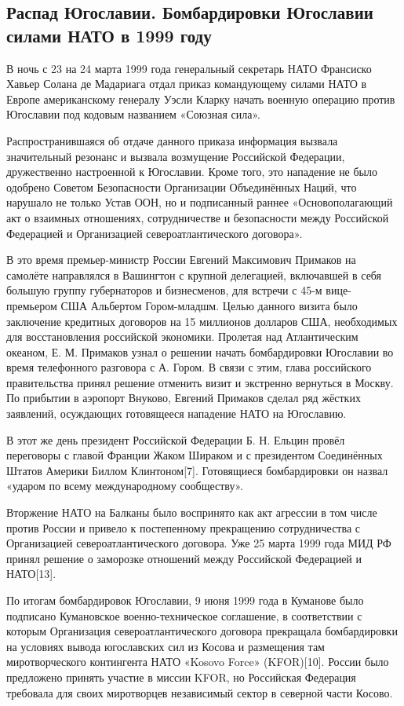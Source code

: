 \subsection{Распад Югославии. Бомбардировки Югославии силами НАТО в 1999 году}
В ночь с 23 на 24 марта 1999 года генеральный секретарь НАТО Франсиско Хавьер Солана де Мадариага отдал приказ командующему силами НАТО в Европе американскому генералу Уэсли Кларку начать военную операцию против Югославии под кодовым названием «Союзная сила».

Распространившаяся об отдаче данного приказа информация вызвала значительный резонанс и вызвала возмущение Российской Федерации, дружественно настроенной к Югославии. Кроме того, это нападение не было одобрено Советом Безопасности Организации Объединённых Наций, что нарушало не только Устав ООН, но и подписанный раннее «Основополагающий акт о взаимных отношениях, сотрудничестве и безопасности между Российской Федерацией и Организацией североатлантического договора». 

В это время премьер-министр России Евгений Максимович Примаков на самолёте направлялся в Вашингтон с крупной делегацией, включавшей в себя большую группу губернаторов и бизнесменов, для встречи с 45-м вице-премьером США Альбертом Гором-младшм. Целью данного визита было заключение кредитных договоров на 15 миллионов долларов США, необходимых для восстановления российской экономики. Пролетая над Атлантическим океаном, Е. М. Примаков узнал о решении начать бомбардировки Югославии во время телефонного разговора с А. Гором. В связи с этим, глава российского правительства принял решение отменить визит и экстренно вернуться в Москву. По прибытии в аэропорт Внуково, Евгений Примаков сделал ряд жёстких заявлений, осуждающих готовящееся нападение НАТО на Югославию.

В этот же день президент Российской Федерации Б. Н. Ельцин провёл переговоры с главой Франции Жаком Шираком и с президентом Соединённых Штатов Америки Биллом Клинтоном[7]. Готовящиеся бомбардировки он назвал «ударом по всему международному сообществу».

Вторжение НАТО на Балканы было воспринято как акт агрессии в том числе против России и привело к постепенному прекращению сотрудничества с Организацией североатлантического договора. Уже 25 марта 1999 года МИД РФ принял решение о заморозке отношений между Российской Федерацией и НАТО[13].

По итогам бомбардировок Югославии, 9 июня 1999 года в Куманове было подписано Кумановское военно-техническое соглашение, в соответствии с которым Организация североатлантического договора прекращала бомбардировки на условиях вывода югославских сил из Косова и размещения там миротворческого контингента НАТО «Kosovo Force» (KFOR)[10]. России было предложено принять участие в миссии KFOR, но Российская Федерация требовала для своих миротворцев независимый сектор в северной части Косово.

